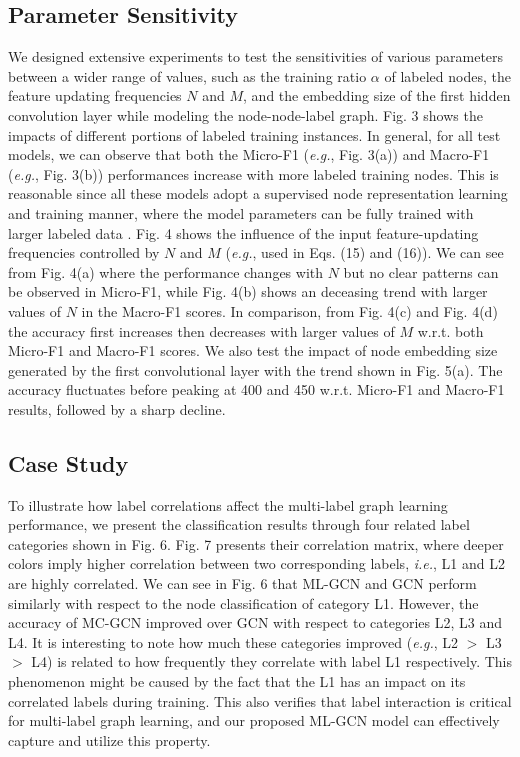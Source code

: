 \documentclass[conference]{IEEEtran}
\begin{document}
\begin{itemize}
\end{itemize}



\subsection{Parameter Sensitivity}
We designed extensive experiments to test the sensitivities of various parameters between a wider range of values, such as the training ratio $\alpha$ of labeled nodes, the feature updating frequencies $N$ and $M$, and the embedding size of the first hidden convolution layer while modeling the node-node-label graph. Fig. 3 shows the impacts of different portions of labeled training instances. In general, for all test models, we can observe that both the Micro-F1 (\textit{e.g.}, Fig. 3(a)) and Macro-F1 (\textit{e.g.}, Fig. 3(b)) performances increase with more labeled training nodes. This is reasonable since all these models adopt a supervised node representation learning and training manner, where the model parameters can be fully trained with larger labeled data \cite{25}. Fig. 4 shows the influence of the input feature-updating frequencies  controlled by $N$ and $M$ (\textit{e.g.}, used in Eqs. (15) and (16)). We can see from Fig. 4(a) where the performance changes with $N$ but no clear patterns can be observed in Micro-F1, while Fig. 4(b) shows an deceasing trend with larger values of $N$ in the Macro-F1 scores. In comparison, from Fig. 4(c) and Fig. 4(d) the accuracy first increases then decreases with larger values of $M$ w.r.t. both Micro-F1 and Macro-F1 scores. We also test the impact of node embedding size generated by the first convolutional layer with the trend shown in Fig. 5(a). The accuracy fluctuates before peaking at 400 and 450 w.r.t. Micro-F1 and Macro-F1 results, followed by a sharp decline.

\subsection{Case Study}
To illustrate how label correlations affect the multi-label graph learning performance, we present the classification results through four related label categories shown in Fig. 6. Fig. 7 presents their correlation matrix, where deeper colors imply higher correlation between two corresponding labels, \textit{i.e.}, L1 and L2 are highly correlated. We can see in Fig. 6 that ML-GCN and GCN perform similarly with respect to the node classification of category L1. However, the accuracy of MC-GCN improved over GCN with respect to categories L2, L3 and L4. It is interesting to note how much these categories improved (\textit{e.g.}, L2 $>$ L3 $>$ L4) is related to how frequently they correlate with label L1 respectively. This phenomenon might be caused by the fact that the L1 has an impact on its correlated labels during training. This also verifies that label interaction is critical for multi-label graph learning, and our proposed ML-GCN model can effectively capture and utilize this property.
\end{document}
